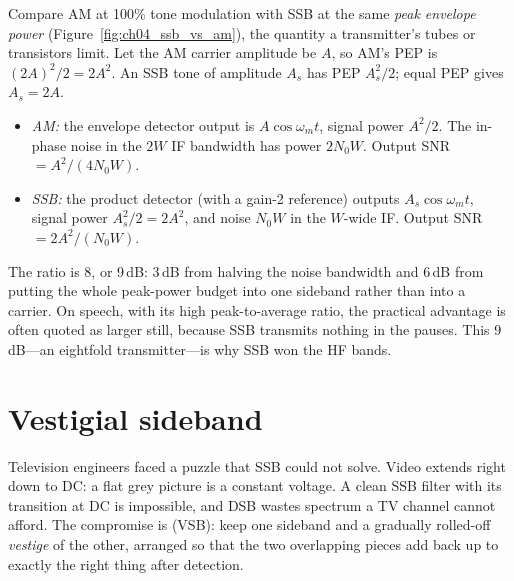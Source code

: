 \begin{worked}
Compare AM at 100\% tone modulation with SSB at the same \emph{peak envelope power}
(Figure~\ref{fig:ch04_ssb_vs_am}), the quantity a
transmitter's tubes or transistors limit. Let the AM carrier amplitude be $A$, so AM's PEP is
$(2A)^2/2=2A^2$. An SSB tone of amplitude $A_s$ has PEP $A_s^2/2$; equal PEP gives $A_s=2A$.
\begin{itemize}
\item \emph{AM:} the envelope detector output is $A\cos\omega_mt$, signal power $A^2/2$. The in-phase
noise in the $2W$ IF bandwidth has power $2N_0W$. Output SNR $=A^2/(4N_0W)$.
\item \emph{SSB:} the product detector (with a gain-2 reference) outputs $A_s\cos\omega_mt$, signal
power $A_s^2/2=2A^2$, and noise $N_0W$ in the $W$-wide IF. Output SNR $=2A^2/(N_0W)$.
\end{itemize}
The ratio is 8, or 9\,dB: 3\,dB from halving the noise bandwidth and 6\,dB from putting the whole
peak-power budget into one sideband rather than into a carrier. On speech, with its high peak-to-average
ratio, the practical advantage is often quoted as larger still, because SSB transmits nothing in the
pauses. This 9\,dB---an eightfold transmitter---is why SSB won the HF bands.
\end{worked}

\section{Vestigial sideband}
\label{sec:ch04:vsb}

Television engineers faced a puzzle that SSB could not solve. Video extends right down to DC: a flat grey
picture is a constant voltage. A clean SSB filter with its transition at DC is impossible, and DSB wastes
spectrum a TV channel cannot afford. The compromise is  (VSB): keep one
sideband and a gradually rolled-off \emph{vestige} of the other, arranged so that the two overlapping
pieces add back up to exactly the right thing after detection.


